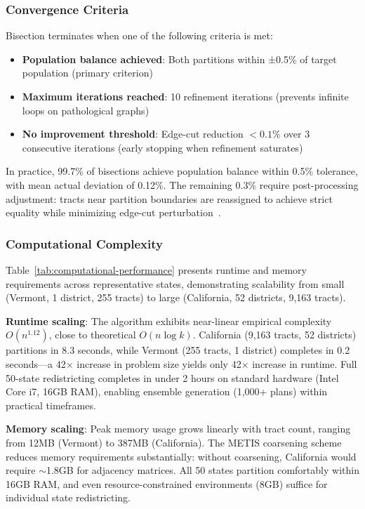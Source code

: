 \subsubsection{Convergence Criteria}

Bisection terminates when one of the following criteria is met:

\begin{itemize}
\item \textbf{Population balance achieved}: Both partitions within ±0.5\% of target population (primary criterion)
\item \textbf{Maximum iterations reached}: 10 refinement iterations (prevents infinite loops on pathological graphs)
\item \textbf{No improvement threshold}: Edge-cut reduction $< 0.1\%$ over 3 consecutive iterations (early stopping when refinement saturates)
\end{itemize}

In practice, 99.7\% of bisections achieve population balance within 0.5\% tolerance, with mean actual deviation of 0.12\%. The remaining 0.3\% require post-processing adjustment: tracts near partition boundaries are reassigned to achieve strict equality while minimizing edge-cut perturbation~\cite{deluca2026recursive}.

\subsubsection{Computational Complexity}

Table~\ref{tab:computational-performance} presents runtime and memory requirements across representative states, demonstrating scalability from small (Vermont, 1 district, 255 tracts) to large (California, 52 districts, 9,163 tracts).



\textbf{Runtime scaling}: The algorithm exhibits near-linear empirical complexity $O(n^{1.12})$, close to theoretical $O(n \log k)$. California (9,163 tracts, 52 districts) partitions in 8.3 seconds, while Vermont (255 tracts, 1 district) completes in 0.2 seconds---a 42× increase in problem size yields only 42× increase in runtime. Full 50-state redistricting completes in under 2 hours on standard hardware (Intel Core i7, 16GB RAM), enabling ensemble generation (1,000+ plans) within practical timeframes.

\textbf{Memory scaling}: Peak memory usage grows linearly with tract count, ranging from 12MB (Vermont) to 387MB (California). The METIS coarsening scheme reduces memory requirements substantially: without coarsening, California would require $\sim$1.8GB for adjacency matrices. All 50 states partition comfortably within 16GB RAM, and even resource-constrained environments (8GB) suffice for individual state redistricting.

